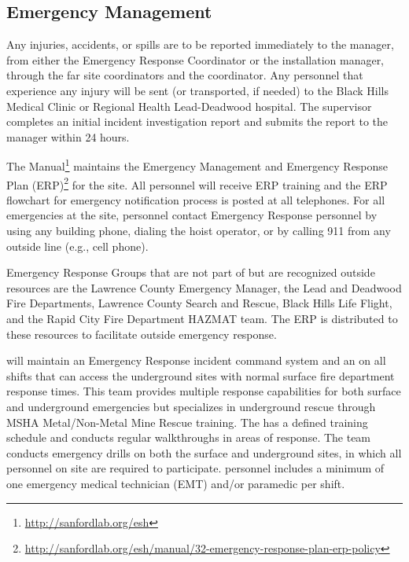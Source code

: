 \subsection{Emergency Management}

Any injuries, accidents, or spills are to be reported immediately to the
  manager, from either the  Emergency
Response Coordinator or the installation manager, through the  far site
 coordinators and the   coordinator. %
Any personnel that
experience any injury will be sent (or transported, if needed) to the Black Hills
Medical Clinic or Regional Health Lead-Deadwood hospital. %
The supervisor  completes an initial incident
investigation report and submits the report to the 
 manager within 24 hours.


The  
Manual\footnote{\url{http://sanfordlab.org/esh}} maintains the Emergency
Management and Emergency Response Plan 
(ERP)\footnote{\url{http://sanfordlab.org/esh/manual/32-emergency-response-plan-erp-policy}}
for the site. All personnel will receive ERP training and the ERP
flowchart for emergency notification process is posted at all
telephones. For all emergencies at the  site, personnel
contact Emergency Response personnel by using any building
phone, dialing the hoist operator, or by calling 911 from any outside
line (e.g., cell phone).

Emergency Response Groups that are not part of  but are recognized
outside resources are the Lawrence County Emergency Manager, the Lead and
Deadwood Fire Departments, Lawrence County Search and Rescue, Black
Hills Life Flight, and the Rapid City Fire Department HAZMAT team. The
 ERP is distributed to these resources to facilitate outside
emergency response.

 will maintain an Emergency Response incident command
system and an  on all shifts that can access the
underground sites with normal surface fire department response
times. This team provides multiple response capabilities for both
surface and underground emergencies but specializes in underground
rescue through MSHA Metal/Non-Metal Mine Rescue training. %
The  has a defined training schedule and conducts regular
walkthroughs in areas of response. The team conducts  emergency drills 
on both the surface and underground sites, in which all personnel on
site are required to participate.  personnel includes a
minimum of one emergency medical technician (EMT) and/or paramedic per
shift. 

